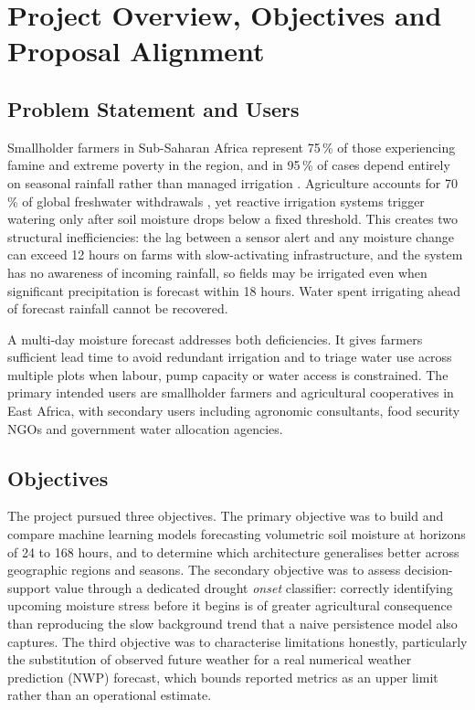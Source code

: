 \documentclass[12pt, a4paper]{article}
\begin{document}
\newpage
\tableofcontents
\newpage

\section{Project Overview, Objectives and Proposal Alignment}

\subsection{Problem Statement and Users}

Smallholder farmers in Sub-Saharan Africa represent 75\,\% of those experiencing
famine and extreme poverty in the region, and in 95\,\% of cases depend entirely
on seasonal rainfall rather than managed irrigation \cite{worldbank2008}.
Agriculture accounts for 70\,\% of global freshwater withdrawals \cite{fao2017},
yet reactive irrigation systems trigger watering only after soil moisture drops
below a fixed threshold. This creates two structural inefficiencies: the lag
between a sensor alert and any moisture change can exceed 12 hours on farms with
slow-activating infrastructure, and the system has no awareness of incoming
rainfall, so fields may be irrigated even when significant precipitation is
forecast within 18 hours. Water spent irrigating ahead of forecast rainfall
cannot be recovered.

A multi-day moisture forecast addresses both deficiencies. It gives farmers
sufficient lead time to avoid redundant irrigation and to triage water use
across multiple plots when labour, pump capacity or water access is constrained.
The primary intended users are smallholder farmers and agricultural cooperatives
in East Africa, with secondary users including agronomic consultants, food
security NGOs and government water allocation agencies.

\subsection{Objectives}

The project pursued three objectives. The primary objective was to build and
compare machine learning models forecasting volumetric soil moisture at horizons
of 24 to 168 hours, and to determine which architecture generalises better
across geographic regions and seasons. The secondary objective was to assess
decision-support value through a dedicated drought \emph{onset} classifier:
correctly identifying upcoming moisture stress before it begins is of greater
agricultural consequence than reproducing the slow background trend that a
naive persistence model also captures. The third objective was to characterise
limitations honestly, particularly the substitution of observed future weather
for a real numerical weather prediction (NWP) forecast, which bounds reported
metrics as an upper limit rather than an operational estimate.
\end{document}
